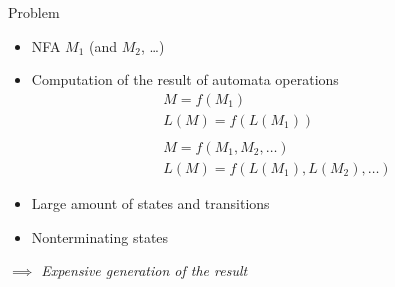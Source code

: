 




\begin{frame}{Problem}
    \begin{itemize}
        \item NFA $M_1$ (and $M_2$, \ldots)
        \item Computation of the result of automata operations
        \begin{align*}
        & M = f(M_1) \\
        & L(M) = f(L(M_1)) \\ \\
        & M = f(M_1, M_2, \ldots) \\
        & L(M) = f(L(M_1), L(M_2), \ldots)
        \end{align*}
        \normalsize
        \item Large amount of states and transitions
        \item Nonterminating states
    \end{itemize}

    \Large \center \emph{$\implies$ Expensive generation of the result}
\end{frame}


